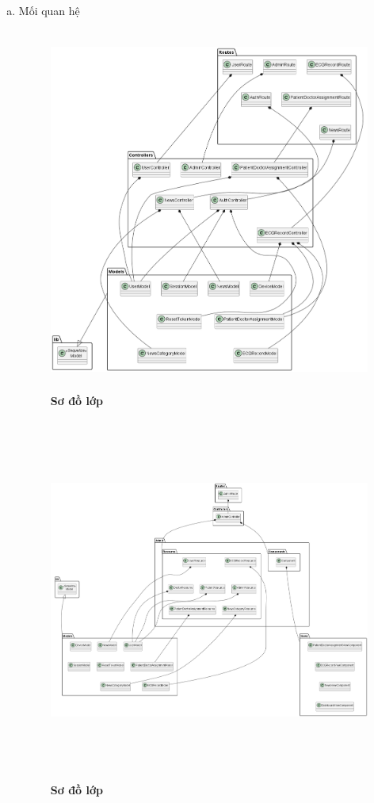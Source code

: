 \documentclass{article}%
\begin{document}
\begin{enumerate}[a)]
\item Mối quan hệ

\begin{figure}[H]
  \centering
  \includegraphics[width=15cm,height=12cm]{Images/server/class/class_relation.png}
  \caption[Sơ đồ lớp]{\bfseries \fontsize{12pt}{0pt}\selectfont Sơ đồ lớp}
  \label{hinh2} %
\end{figure}


\begin{figure}[H]
  \centering
  \includegraphics[width=15cm,height=12cm]{Images/server/class/class_admin_relation.png}
  \caption[Sơ đồ lớp]{\bfseries \fontsize{12pt}{0pt}\selectfont Sơ đồ lớp}
  \label{hinh2} %
\end{figure}

\end{enumerate}
\end{document}
